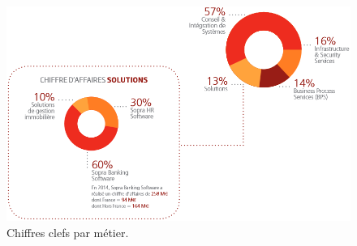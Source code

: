 \documentclass[12pt,a4paper]{article}
\begin{document}
\begin{figure}[!hp]
		\begin{center}
			\includegraphics[width=\textwidth,height=\textheight,keepaspectratio]{chiffreClefsMetier.png}
			\caption{Chiffres clefs par métier.}
		\end{center}
\end{figure}
\newpage
\end{document}
